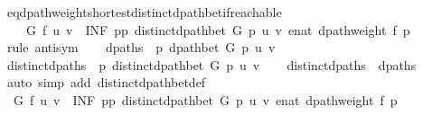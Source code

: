 \begin{isabellebody}
\isamarkupfalse%
%
\endisatagproof
{\isafoldproof}%
%
\isadelimproof
\isanewline
%
\endisadelimproof
%
\isadeliminvisible
\isanewline
%
\endisadeliminvisible
%
\isataginvisible
{}\isamarkupfalse%
\ {\isasymdelta}{\isacharunderscore}{\kern0pt}eq{\isacharunderscore}{\kern0pt}dpath{\isacharunderscore}{\kern0pt}weight{\isacharunderscore}{\kern0pt}shortest{\isacharunderscore}{\kern0pt}distinct{\isacharunderscore}{\kern0pt}dpath{\isacharunderscore}{\kern0pt}bet{\isacharunderscore}{\kern0pt}if{\isacharunderscore}{\kern0pt}reachable{\isacharcolon}{\kern0pt}\isanewline
\ \ \ {\isachardoublequoteopen}{\isasymdelta}\ G\ f\ u\ v\ {\isacharequal}{\kern0pt}\ {\isacharparenleft}{\kern0pt}INF\ p{\isasymin}{\isacharbraceleft}{\kern0pt}p{\isachardot}{\kern0pt}\ distinct{\isacharunderscore}{\kern0pt}dpath{\isacharunderscore}{\kern0pt}bet\ G\ p\ u\ v{\isacharbraceright}{\kern0pt}{\isachardot}{\kern0pt}\ enat\ {\isacharparenleft}{\kern0pt}dpath{\isacharunderscore}{\kern0pt}weight\ f\ p{\isacharparenright}{\kern0pt}{\isacharparenright}{\kern0pt}{\isachardoublequoteclose}%
\endisataginvisible
{\isafoldinvisible}%
%
\isadeliminvisible
\isanewline
%
\endisadeliminvisible
%
\isadelimproof
%
\endisadelimproof
%
\isatagproof
{}\isamarkupfalse%
\ {\isacharparenleft}{\kern0pt}rule\ antisym{\isacharparenright}{\kern0pt}\isanewline
\ \ \isamarkupfalse%
\ {\isacharquery}{\kern0pt}dpaths\ {\isacharequal}{\kern0pt}\ {\isachardoublequoteopen}{\isacharbraceleft}{\kern0pt}p{\isachardot}{\kern0pt}\ dpath{\isacharunderscore}{\kern0pt}bet\ G\ p\ u\ v{\isacharbraceright}{\kern0pt}{\isachardoublequoteclose}\isanewline
\ \ \isamarkupfalse%
\ {\isacharquery}{\kern0pt}distinct{\isacharunderscore}{\kern0pt}dpaths\ {\isacharequal}{\kern0pt}\ {\isachardoublequoteopen}{\isacharbraceleft}{\kern0pt}p{\isachardot}{\kern0pt}\ distinct{\isacharunderscore}{\kern0pt}dpath{\isacharunderscore}{\kern0pt}bet\ G\ p\ u\ v{\isacharbraceright}{\kern0pt}{\isachardoublequoteclose}\isanewline
\isanewline
\ \ \isamarkupfalse%
\ {\isachardoublequoteopen}{\isacharquery}{\kern0pt}distinct{\isacharunderscore}{\kern0pt}dpaths\ {\isasymsubseteq}\ {\isacharquery}{\kern0pt}dpaths{\isachardoublequoteclose}\isanewline
\ \ \ \ \isamarkupfalse%
\ {\isacharparenleft}{\kern0pt}auto\ simp\ add{\isacharcolon}{\kern0pt}\ distinct{\isacharunderscore}{\kern0pt}dpath{\isacharunderscore}{\kern0pt}bet{\isacharunderscore}{\kern0pt}def{\isacharparenright}{\kern0pt}\isanewline
\ \ \isamarkupfalse%
\ {\isachardoublequoteopen}{\isasymdelta}\ G\ f\ u\ v\ {\isasymle}\ {\isacharparenleft}{\kern0pt}INF\ p{\isasymin}{\isacharbraceleft}{\kern0pt}p{\isachardot}{\kern0pt}\ distinct{\isacharunderscore}{\kern0pt}dpath{\isacharunderscore}{\kern0pt}bet\ G\ p\ u\ v{\isacharbraceright}{\kern0pt}{\isachardot}{\kern0pt}\ enat\ {\isacharparenleft}{\kern0pt}dpath{\isacharunderscore}{\kern0pt}weight\ f\ p{\isacharparenright}{\kern0pt}{\isacharparenright}{\kern0pt}{\isachardoublequoteclose}\isanewline

\end{isabellebody}
